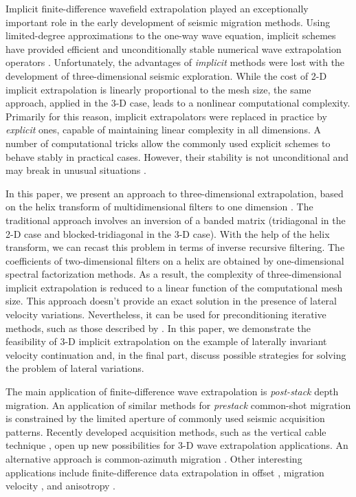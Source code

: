 Implicit finite-difference wavefield extrapolation played an
exceptionally important role in the early development of seismic
migration methods. Using limited-degree approximations to the one-way
wave equation, implicit schemes have provided efficient and
unconditionally stable numerical wave extrapolation operators
\cite{Godfrey.sep.16.83,Claerbout.blackwell.85}. Unfortunately, the
advantages of \emph{implicit} methods were lost with the development
of three-dimensional seismic exploration. While the cost of 2-D
implicit extrapolation is linearly proportional to the mesh size, the
same approach, applied in the 3-D case, leads to a nonlinear
computational complexity. Primarily for this reason, implicit
extrapolators were replaced in practice by \emph{explicit} ones,
capable of maintaining linear complexity in all dimensions. A number
of computational tricks \cite{GEO56.11.17701777} allow the commonly
used explicit schemes to behave stably in practical cases.  However,
their stability is not unconditional and may break in unusual
situations \cite{etgen}.
\par
In this paper, we present an approach to three-dimensional
extrapolation, based on the helix transform of multidimensional
filters to one dimension \cite{Claerbout.gem.97}. The traditional
approach involves an inversion of a banded matrix (tridiagonal in the
2-D case and blocked-tridiagonal in the 3-D case). With the help of
the helix transform, we can recast this problem in terms of inverse
recursive filtering.  The coefficients of two-dimensional filters on a
helix are obtained by one-dimensional spectral factorization methods.
As a result, the complexity of three-dimensional implicit
extrapolation is reduced to a linear function of the computational
mesh size. This approach doesn't provide an exact solution in the
presence of lateral velocity variations. Nevertheless, it can be used
for preconditioning iterative methods, such as those described by
.  In this paper, we demonstrate the
feasibility of 3-D implicit extrapolation on the example of laterally
invariant velocity continuation and, in the final part, discuss
possible strategies for solving the problem of lateral variations.
\par
The main application of finite-difference wave extrapolation is
\emph{post-stack} depth migration. An application of similar methods
for \emph{prestack} common-shot migration is constrained by the
limited aperture of commonly used seismic acquisition patterns.
Recently developed acquisition methods, such as the vertical cable
technique \cite{cable}, open up new possibilities for 3-D wave
extrapolation applications. An alternative approach is common-azimuth
migration \cite{Biondi.sep.80.109,Biondi.sep.93.1}. Other interesting
applications include finite-difference data extrapolation in offset
\cite{Fomel.sep.84.179}, migration velocity \cite{Fomel.sep.92.159},
and anisotropy \cite{Alkhalifah.sep.94.tariq3}.

